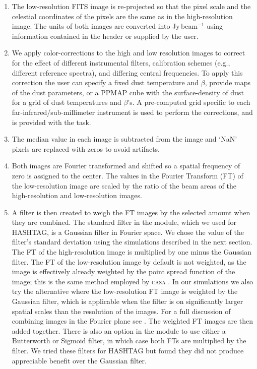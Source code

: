\documentclass[a4paper,fleqn,usenatbib, twocolumn]{aastex63}
\begin{document}
\begin{enumerate}
  \item The low-resolution FITS image is re-projected so that the pixel scale and the celestial coordinates of the pixels are the same as in the high-resolution image. The units of both
  images are converted into Jy\,beam$^{-1}$ using information 
  contained in the header or supplied by the user.
  
  \item We apply color-corrections to the high and low resolution images to correct for the effect of different instrumental filters, 
  calibration schemes (e.g., different reference spectra), and differing central frequencies. To apply this correction the user can specify
  a fixed dust temperature and $\beta$, provide maps of the dust parameters, or a PPMAP cube with the surface-density of dust for a grid of dust temperatures and $\beta$'s. A pre-computed grid specific to each far-infrared/sub-millimeter instrument is used to perform the corrections, and is provided with the task.
 
   
  \item The median value in each image is subtracted from the image and `NaN' pixels are replaced with zeros to avoid artifacts.
  
  \item Both images are Fourier transformed and shifted so a spatial frequency of zero is assigned to the center. The values in the Fourier Transform (FT) of the low-resolution
  image are scaled by the ratio of the beam areas of the high-resolution and low-resolution images.
  
  \item A filter is then created to weigh the FT images by
  the selected amount when they are combined. The standard filter in the module,
  which we used for HASHTAG, is a Gaussian filter in Fourier space. We chose the
  value of the filter's standard deviation using the simulations described
  in the next section.   
  The FT of the high-resolution image is
  multiplied by one minus the Gaussian filter. 
  The FT of the low-resolution image by default is not  
  weighted, as the image is effectively already weighted by the point spread function of the image; this is the same method employed by \textsc{casa} \citep{casa}. 
  In our simulations we also try the alternative where the low-resolution FT image 
  is weighted by the Gaussian filter, which is applicable when the filter is on significantly larger spatial scales than the 
  resolution of the images. For a full discussion of combining images in the Fourier plane see \citet{Stanimirovic2002}.
  The weighted FT images are then added together. There is also an option in the module to use either a Butterworth \citep{Csengeri2016} or Sigmoid filter, in which case both FTs are multiplied
  by the filter. We tried these filters for HASHTAG but found they did not
  produce appreciable 
  benefit over the Gaussian filter.
  

\end{enumerate}
\end{document}
